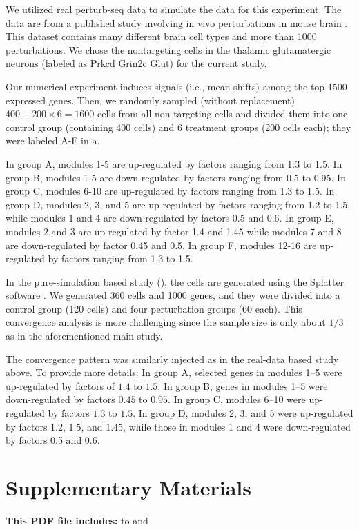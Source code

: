 \documentclass[11pt]{article}
\newenvironment{revblockr3}
  {\color[RGB]{210,110,110}}
  {}
\begin{document}
\begin{revblockr3}
We utilized real perturb-seq data to simulate the data for this experiment.  The data are from a published study involving in vivo perturbations in mouse brain \cite{shi2026genome}. This dataset contains many different brain cell types and more than 1000 perturbations. We chose the nontargeting cells in the thalamic glutamatergic neurons (labeled as Prkcd Grin2c Glut) for the current study.

Our numerical experiment induces signals (i.e., mean shifts) among the top 1500 expressed genes. Then, we randomly sampled (without replacement) $400+200\times6=1600$ cells from all non-targeting cells and divided them into one control group (containing 400 cells) and 6 treatment groups (200 cells each); they were labeled A-F in a.

In group A, modules 1-5 are up-regulated by factors ranging from 1.3 to 1.5. In group B, modules 1-5 are down-regulated by factors ranging from 0.5 to 0.95. In group C, modules 6-10 are up-regulated by factors ranging from 1.3 to 1.5. In group D, modules 2, 3, and 5 are up-regulated by factors ranging from 1.2 to 1.5, while modules 1 and 4 are down-regulated by factors 0.5 and 0.6. In group E, modules 2 and 3 are up-regulated by factor 1.4 and 1.45 while modules 7 and 8 are down-regulated by factor 0.45 and 0.5. In group F, modules 12-16 are up-regulated by factors ranging from 1.3 to 1.5.

In the pure-simulation based study (), the cells are generated using the Splatter software \cite{zappia2017splatter}. We generated 360 cells and 1000 genes, and they were divided into a control group (120 cells) and four perturbation groups (60 each). This convergence analysis is more challenging since the sample size is only about $1/3$ as in the aforementioned main study.

The convergence pattern was similarly injected as in the real-data based study above. To provide more details: In group A, selected genes in modules 1–5 were up-regulated by factors of $1.4$ to $1.5$. In group B, genes in modules 1–5 were down-regulated by factors $0.45$ to $0.95$. In group C, modules 6–10 were up-regulated by factors $1.3$ to $1.5$. In group D, modules 2, 3, and 5 were up-regulated by factors 1.2, 1.5, and 1.45, while those in modules 1 and 4 were down-regulated by factors 0.5 and 0.6.
\end{revblockr3}

\section*{Supplementary Materials}
\textbf{This PDF file includes:}  to  and .
\end{document}
